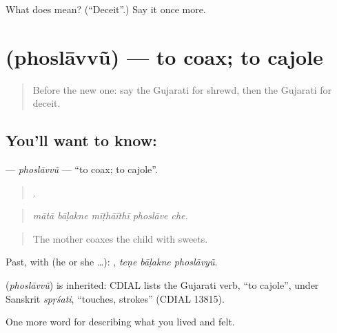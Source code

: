 \begin{tcolorbox}[breakable,colback=teal!4,colframe=teal!35!black,title={Before you move on}]
What does  mean? (\textquotedblleft{}Deceit\textquotedblright{}.) Say it once more.
\end{tcolorbox}
\section[\texorpdfstring{\gu{ફોસલાવવું} (phoslāvvũ)}{ફોસલાવવું (phoslāvvũ)}]{ (phoslāvvũ) — to coax; to cajole}

\label{lesson:GU-C460-phoslavvu}



\begin{quote}
Before the new one: say the Gujarati for shrewd, then the Gujarati for deceit.
\end{quote}

\subsection*{You'll want to know: }
\textbf{} — \emph{phoslāvvũ} — \textquotedblleft{}to coax; to cajole\textquotedblright{}.

\begin{quote}
    .
\end{quote}

\begin{quote}
\emph{mātā bāḷakne mīṭhāīthī phoslāve che.}
\end{quote}

\begin{quote}
The mother coaxes the child with sweets.
\end{quote}

Past, with  (he or she …):   , \emph{teṇe bāḷakne phoslāvyũ}.

\begin{cousinweb}
\textbf{} (\emph{phoslāvvũ}) is inherited: CDIAL lists the Gujarati verb, \textquotedblleft{}to cajole\textquotedblright{}, under Sanskrit \emph{spṛśati}, \textquotedblleft{}touches, strokes\textquotedblright{} (CDIAL 13815).
\end{cousinweb}

\begin{grammarlens}[title={What you've built}]
One more word for describing what you lived and felt.
\end{grammarlens}

